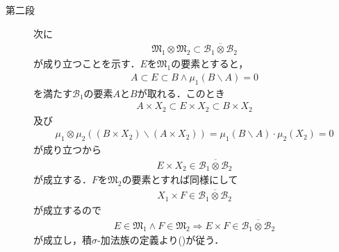 \begin{prf}
\begin{description}
				\item[第二段]
					次に
					\begin{align}
						\mathfrak{M}_1 \otimes \mathfrak{M}_2
						\subset \overline{\mathcal{B}_1 \otimes \mathcal{B}_2}
						\label{eq:thm_product_space_of_complete_measure_space_2}
					\end{align}
					が成り立つことを示す．$E$を$\mathfrak{M}_1$の要素とすると，
					\begin{align}
						A \subset E \subset B \wedge \mu_1( B \backslash A ) = 0
					\end{align}
					を満たす$\mathcal{B}_1$の要素$A$と$B$が取れる．このとき
					\begin{align}
						A \times X_2 \subset E \times X_2 \subset B \times X_2
					\end{align}
					及び
					\begin{align}
						\mu_1 \otimes \mu_2\left((B \times X_2) \backslash (A \times X_2)\right)
						= \mu_1( B \backslash A ) \cdot \mu_2(X_2)
						= 0
					\end{align}
					が成り立つから
					\begin{align}
						E \times X_2 \in \overline{\mathcal{B}_1 \otimes \mathcal{B}_2}
					\end{align}
					が成立する．$F$を$\mathfrak{M}_2$の要素とすれば同様にして
					\begin{align}
						X_1 \times F \in \overline{\mathcal{B}_1 \otimes \mathcal{B}_2}
					\end{align}
					が成立するので
					\begin{align}
						E \in \mathfrak{M}_1 \wedge F \in \mathfrak{M}_2
						\Longrightarrow E \times F \in \overline{\mathcal{B}_1 \otimes \mathcal{B}_2}
					\end{align}
					が成立し，積$\sigma$-加法族の定義より()が従う．
				

\end{description}
\end{prf}
